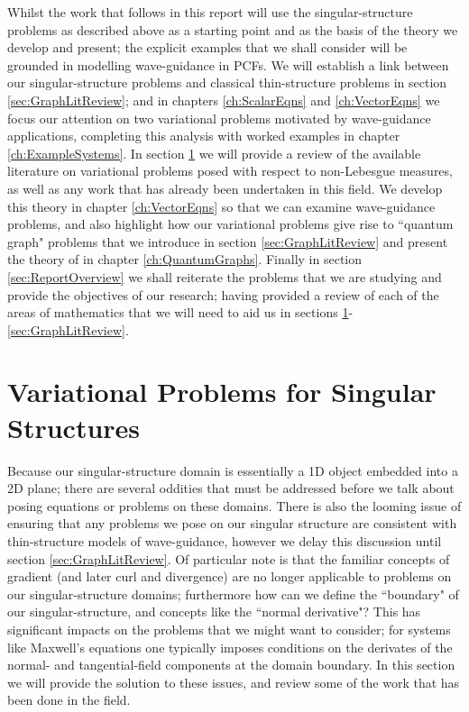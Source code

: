 Whilst the work that follows in this report will use the singular-structure problems as described above as a starting point and as the basis of the theory we develop and present; the explicit examples that we shall consider will be grounded in modelling wave-guidance in PCFs.
We will establish a link between our singular-structure problems and classical thin-structure problems in section \ref{sec:GraphLitReview}; and in chapters \ref{ch:ScalarEqns} and \ref{ch:VectorEqns} we focus our attention on two variational problems motivated by wave-guidance applications, completing this analysis with worked examples in chapter \ref{ch:ExampleSystems}.
In section \ref{sec:VariationalProblemLitReview} we will provide a review of the available literature on variational problems posed with respect to non-Lebesgue measures, as well as any work that has already been undertaken in this field.
We develop this theory in chapter \ref{ch:VectorEqns} so that we can examine wave-guidance problems, and also highlight how our variational problems give rise to ``quantum graph" problems that we introduce in section \ref{sec:GraphLitReview} and present the theory of in chapter \ref{ch:QuantumGraphs}.
Finally in section \ref{sec:ReportOverview} we shall reiterate the problems that we are studying and provide the objectives of our research; having provided a review of each of the areas of mathematics that we will need to aid us in sections \ref{sec:VariationalProblemLitReview}-\ref{sec:GraphLitReview}.

\section{Variational Problems for Singular Structures} \label{sec:VariationalProblemLitReview}
Because our singular-structure domain is essentially a 1D object embedded into a 2D plane; there are several oddities that must be addressed before we talk about posing equations or problems on these domains.
There is also the looming issue of ensuring that any problems we pose on our singular structure are consistent with thin-structure models of wave-guidance, however we delay this discussion until section \ref{sec:GraphLitReview}.
Of particular note is that the familiar concepts of gradient (and later curl and divergence) are no longer applicable to problems on our singular-structure domains; furthermore how can we define the ``boundary" of our singular-structure, and concepts like the ``normal derivative"?
This has significant impacts on the problems that we might want to consider; for systems like Maxwell's equations one typically imposes conditions on the derivates of the normal- and tangential-field components at the domain boundary. 
In this section we will provide the solution to these issues, and review some of the work that has been done in the field. \newline


